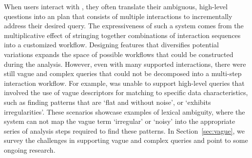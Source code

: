 When users interact with \zv, 
they often translate their ambiguous, 
high-level questions 
into an plan that consists of multiple interactions 
to incrementally address their desired query. 
The expressiveness of such a system 
comes from the multiplicative effect 
of stringing together combinations of 
interaction sequences into a customized workflow. 
Designing features that diversifies potential 
variations expands the space of possible workflows 
that could be constructed during the analysis. 
However, even with many supported interactions, 
there were still vague and complex queries 
that could not be decomposed 
into a multi-step interaction workflow. 
For example, \zv was unable to support 
high-level queries that involved the use of vague 
descriptors for matching to specific data 
characteristics, such as finding patterns that 
are `flat and without noise', or `exhibits irregularities'. 
These scenarios showcase examples of lexical ambiguity, 
where the system can not map the vague term `irregular' or `noisy' 
into the appropriate series of analysis steps 
required to find these patterns. 
In Section~\ref{sec:vague}, we survey the challenges 
in supporting vague and complex queries 
and point to some ongoing research.

